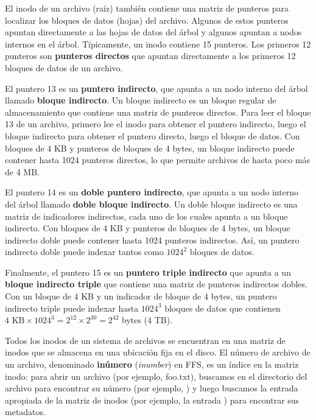 \documentclass[10pt]{book}
\begin{document}
El inodo de un archivo (raíz) también contiene una matriz de punteros para localizar los bloques de datos (hojas) del archivo. Algunos de estos punteros apuntan directamente a las hojas de datos del árbol y algunos apuntan a nodos internos en el árbol. Típicamente, un inodo contiene 15 punteros. Los primeros 12 punteros son \textbf{punteros directos} que apuntan directamente a los primeros 12 bloques de datos de un archivo.

El puntero 13 es un \textbf{puntero indirecto}, que apunta a un nodo interno del árbol llamado \textbf{bloque indirecto}. Un bloque indirecto es un bloque regular de almacenamiento que contiene una matriz de punteros directos. Para leer el bloque 13 de un archivo, primero lee el inodo para obtener el puntero indirecto, luego el bloque indirecto para obtener el puntero directo, luego el bloque de datos. Con bloques de 4 KB y punteros de bloques de 4 bytes, un bloque indirecto puede contener hasta 1024 punteros directos, lo que permite archivos de hasta poco más de 4 MB.

El puntero 14 es un \textbf{doble puntero indirecto}, que apunta a un nodo interno del árbol llamado \textbf{doble bloque indirecto}. Un doble bloque indirecto es una matriz de indicadores indirectos, cada uno de los cuales apunta a un bloque indirecto. Con bloques de 4 KB y punteros de bloques de 4 bytes, un bloque indirecto doble puede contener hasta 1024 punteros indirectos. Así, un puntero indirecto doble puede indexar tantos como $1024^2$ bloques de datos.

Finalmente, el puntero 15 es un \textbf{puntero triple indirecto} que apunta a un \textbf{bloque indirecto triple} que contiene una matriz de punteros indirectos dobles. Con un bloque de 4 KB y un indicador de bloque de 4 bytes, un puntero indirecto triple puede indexar hasta $1024^3$ bloques de datos que contienen $4\text{ KB}\times 1024^3 = 2^{12} \times 2^{30} = 2^{42}$ bytes (4 TB).

Todos los inodos de un sistema de archivos se encuentran en una matriz de inodos que se almacena en una ubicación fija en el disco. El número de archivo de un archivo, denominado \textbf{inúmero} (\textit{inumber}) en FFS, es un índice en la matriz inodo: para abrir un archivo (por ejemplo, {\mf foo.txt}), buscamos en el directorio del archivo para encontrar su número (por ejemplo, {}) y luego buscamos la entrada apropiada de la matriz de inodos (por ejemplo, la entrada {}) para encontrar sus metadatos.
\end{document}
